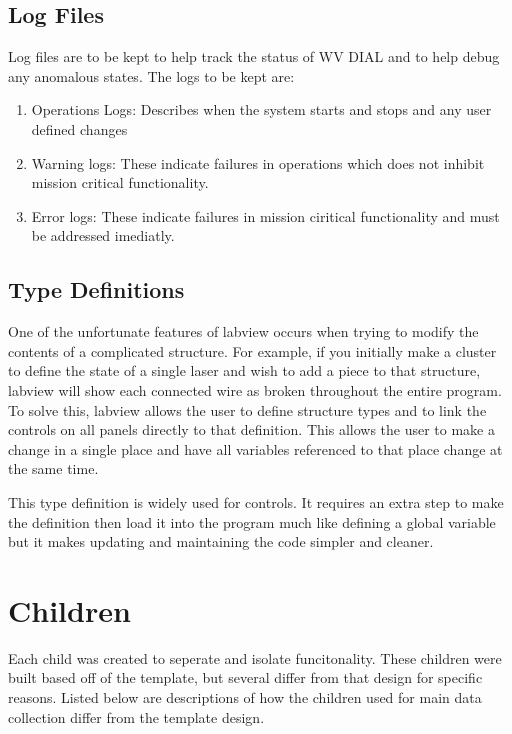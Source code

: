 \subsection{Log Files}

Log files are to be kept to help track the status of WV DIAL and to help debug any anomalous states. The logs to be kept are:

\begin{enumerate}
\item{Operations Logs: Describes when the system starts and stops and any user defined changes}
\item{Warning logs: These indicate failures in operations which does not inhibit mission critical functionality.}
\item{Error logs: These indicate failures in mission ciritical functionality and must be addressed imediatly.}
\end{enumerate}

\subsection{Type Definitions}

One of the unfortunate features of labview occurs when trying to modify the contents of a complicated structure. For example, if you initially make a cluster to define the state of a single laser and wish to add a piece to that structure, labview will show each connected wire as broken throughout the entire program. To solve this, labview allows the user to define structure types and to link the controls on all panels directly to that definition. This allows the user to make a change in a single place and have all variables referenced to that place change at the same time. 

This type definition is widely used for controls. It requires an extra step to make the definition then load it into the program much like defining a global variable but it makes updating and maintaining the code simpler and cleaner. 






\section{Children}\label{Sec:Children}

Each child was created to seperate and isolate funcitonality. These children were built based off of the template, but several differ from that design for specific reasons. Listed below are descriptions of how the children used for main data collection differ from the template design. 

